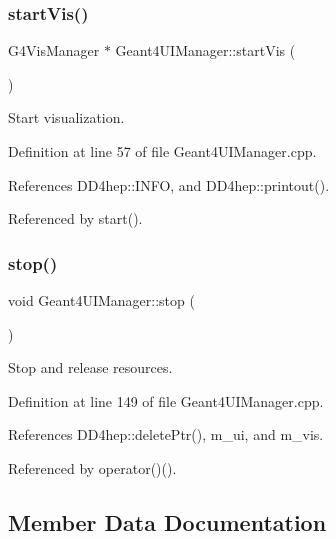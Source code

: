 \subsubsection{\texorpdfstring{start\+Vis()}{startVis()}}
{\footnotesize\ttfamily G4\+Vis\+Manager $\ast$ Geant4\+U\+I\+Manager\+::start\+Vis (\begin{DoxyParamCaption}{ }\end{DoxyParamCaption})}



Start visualization. 



Definition at line 57 of file Geant4\+U\+I\+Manager.\+cpp.



References D\+D4hep\+::\+I\+N\+FO, and D\+D4hep\+::printout().



Referenced by start().

\hypertarget{class_d_d4hep_1_1_simulation_1_1_geant4_u_i_manager_ab6f7bb12343b10b7d5ea19a422ad9718}{}\label{class_d_d4hep_1_1_simulation_1_1_geant4_u_i_manager_ab6f7bb12343b10b7d5ea19a422ad9718} 
\subsubsection{\texorpdfstring{stop()}{stop()}}
{\footnotesize\ttfamily void Geant4\+U\+I\+Manager\+::stop (\begin{DoxyParamCaption}{ }\end{DoxyParamCaption})}



Stop and release resources. 



Definition at line 149 of file Geant4\+U\+I\+Manager.\+cpp.



References D\+D4hep\+::delete\+Ptr(), m\+\_\+ui, and m\+\_\+vis.



Referenced by operator()().



\subsection{Member Data Documentation}
\hypertarget{class_d_d4hep_1_1_simulation_1_1_geant4_u_i_manager_a9c64c0675309cf8f76c23249e58cf3db}{}\label{class_d_d4hep_1_1_simulation_1_1_geant4_u_i_manager_a9c64c0675309cf8f76c23249e58cf3db} 
